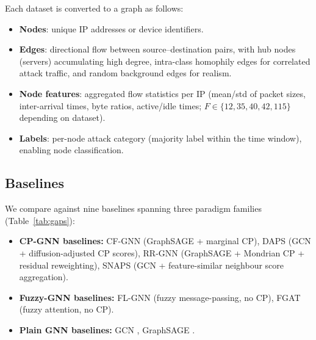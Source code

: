 Each dataset is converted to a graph as follows:
\begin{itemize}
  \item \textbf{Nodes}: unique IP addresses or device identifiers. 
  \item \textbf{Edges}: directional flow between source–destination pairs,
        with hub nodes (servers) accumulating high degree,
        intra-class homophily edges for correlated attack traffic,
        and random background edges for realism. 
  \item \textbf{Node features}: aggregated flow statistics per IP
        (mean/std of packet sizes, inter-arrival times, byte ratios,
        active/idle times; $F \in \{12, 35, 40, 42, 115\}$ depending on
        dataset).
  \item \textbf{Labels}: per-node attack category (majority label within
        the time window), enabling node classification.
\end{itemize}

\subsection{Baselines}
\label{sec:baselines}

We compare against nine baselines spanning three paradigm families
(Table~\ref{tab:gaps}):

\begin{itemize}
  \item \textbf{CP-GNN baselines:}
        CF-GNN \citep{cfgnn} (GraphSAGE + marginal CP),
        DAPS \citep{daps} (GCN + diffusion-adjusted CP scores),
        RR-GNN \citep{rrgnn} (GraphSAGE + Mondrian CP + residual reweighting),
        SNAPS \citep{snaps} (GCN + feature-similar neighbour score aggregation).
  \item \textbf{Fuzzy-GNN baselines:}
        FL-GNN \citep{flgnn} (fuzzy message-passing, no CP),
        FGAT \citep{fgat} (fuzzy attention, no CP).
  \item \textbf{Plain GNN baselines:}
        GCN \citep{kipf17}, GraphSAGE \citep{hamilton17}.
\end{itemize}

